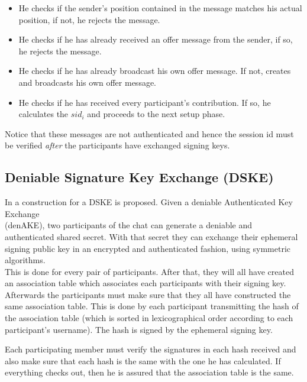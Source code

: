 \documentclass[12pt,titlepage,a4paper]{article}
\begin{document}
{\begin{itemize}
	\item[]He checks if the sender's position contained in the message matches his actual position, if not, he rejects the message.

	\item[]He checks if he has already received an offer message from the sender, if so, he rejects the message.

	\item[]He checks if he has already broadcast his own offer message. If not, creates and broadcasts his own offer message.

	\item[]He checks if he has received every participant's contribution. If so, he calculates the $sid_i$ and proceeds to the next setup phase.
\end{itemize}

Notice that these messages are not authenticated and hence the session id must
be verified \emph{after} the participants have exchanged signing keys.


\clearpage
\subsection{Deniable Signature Key Exchange (DSKE)}
\label{DSKE}
In \cite{mpotr} a construction for a DSKE is proposed. Given a deniable
Authenticated Key Exchange\\ (denAKE), two participants of the chat can
generate a deniable and authenticated shared secret. With that secret
they can exchange their ephemeral signing public key in an encrypted and
authenticated fashion, using symmetric algorithms.\\

This is done for every pair of participants. After that, they will all have
created an association table which associates each participants with their
signing key. Afterwards the participants must make sure that they all have
constructed the same association table. This is done by each participant
transmitting the hash of the association table (which is sorted in
lexicographical order according to each participant's username). The hash
is signed by the ephemeral signing key.

Each participating member must verify the signatures in each hash received and also
make sure that each hash is the same with the one he has calculated. If everything
checks out, then he is assured that the association table is the same.

}
\end{document}
